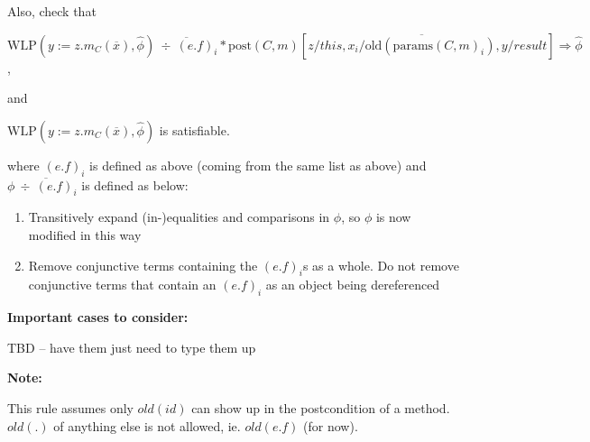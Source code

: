 \documentclass {article}
\newcommand{\fphi}{\widehat{\phi}}
\newcommand{\imp}{\Rightarrow}
\newcommand{\wlp}[2]{\text{WLP}(#1,#2)}
\begin{document}
Also, check that 

$\wlp{y := z.m_C(\overline{x})}{\fphi} \overline{\ \div \ (e.f)_i} \ast \text{post}(C,m)\left[z/this, \overline{x_i/\text{old}(\text{params}(C,m)_i)}, y/result \right] \imp \fphi$,

and


$\wlp{y := z.m_C(\overline{x})}{\fphi}$ is satisfiable. 


where $(e.f)_i$ is defined as above (coming from the same list as above) and $\phi \overline{\ \div \ (e.f)_i}$ is defined as below:

\begin{enumerate}
\item Transitively expand (in-)equalities and comparisons in $\phi$, so $\phi$ is now modified in this way
\item Remove conjunctive terms containing the $(e.f)_i$s as a whole. Do not remove conjunctive terms that contain an $(e.f)_i$ as an object being dereferenced
\end{enumerate}


\textbf{Important cases to consider:}

TBD -- have them just need to type them up
%

\textbf{Note:}

This rule assumes only $old(id)$ can show up in the postcondition of a method. $old(.)$ of anything else is not allowed, ie. $old(e.f)$ (for now).
\end{document}
